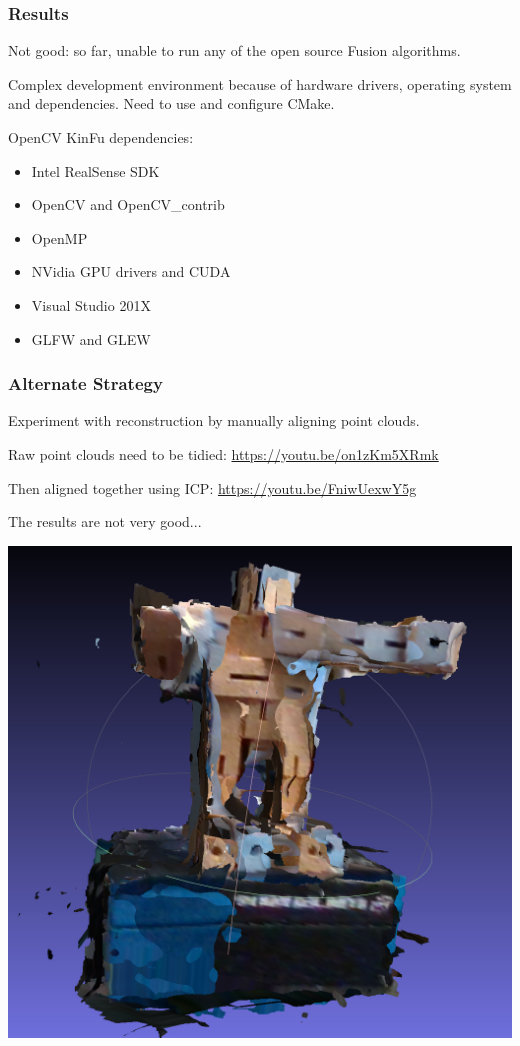 \begin{frame}[allowframebreaks]
\frametitle{Results}

Not good: so far, unable to run any of the open source Fusion algorithms.

Complex development environment because of hardware drivers, operating system
and dependencies. Need to use and configure CMake.

OpenCV KinFu dependencies:
\begin{itemize}
  \item Intel RealSense SDK
  \item OpenCV and OpenCV\_contrib
  \item OpenMP
  \item NVidia GPU drivers and CUDA
  \item Visual Studio 201X
  \item GLFW and GLEW
\end{itemize}
\end{frame}

\begin{frame}[allowframebreaks]
  \frametitle{Alternate Strategy}
Experiment with reconstruction by manually aligning point clouds.

Raw point clouds need to be tidied:
\url{https://youtu.be/on1zKm5XRmk}

Then aligned together using ICP:
\url{https://youtu.be/FniwUexwY5g}

The results are not very good...
\begin{center}
\includegraphics[scale=0.15]{img/cube_man_aligned_point_clouds.PNG}
\end{center}
\end{frame}


